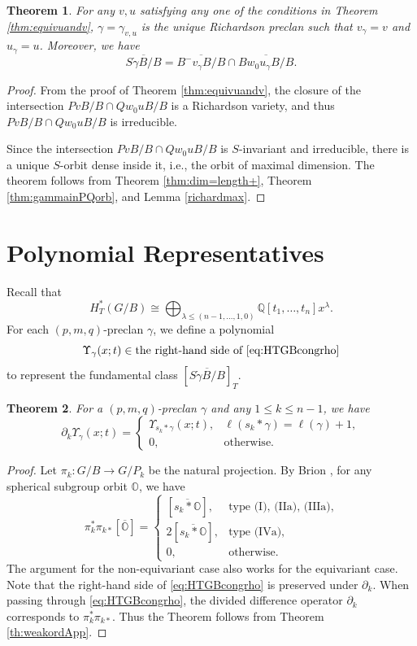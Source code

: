 \documentclass[12pt,reqno]{amsart}
\numberwithin{equation}{section}
\newtheorem{theorem}{Theorem}[section]
\theoremstyle{definition}
\begin{document}
\begin{theorem}\label{prop:RichApp}
For any $v,u$ satisfying any one of the conditions in Theorem \ref{thm:equivuandv}, $\gamma=\gamma_{v,u}$ is the unique  Richardson preclan  such that $v_{\gamma}=v$ and $u_{\gamma} =u$. 
Moreover, we have 
$$\overline{S\dot{\gamma}B/B}=\overline{B^-v_\gamma B/B}\cap \overline{Bw_0u_\gamma B/B}. $$
\end{theorem}
\begin{proof}
From the proof of Theorem \ref{thm:equivuandv}, 
the closure of the intersection $PvB/B\cap Qw_0uB/B$ is a Richardson variety, and thus $PvB/B\cap Qw_0uB/B$ is irreducible. 

Since the intersection $PvB/B\cap Qw_0uB/B$ is $S$-invariant and irreducible, there is a unique $S$-orbit dense inside it, i.e., the orbit of maximal dimension. 
The theorem  follows from Theorem \ref{thm:dim=length+},  Theorem \ref{thm:gammainPQorb}, and Lemma \ref{richardmax}.
\end{proof}



\section{Polynomial Representatives}\label{Polynomial Representatives}

Recall that 
\begin{equation}\label{eq:HTGBcongrho}
H_T^*(G/B)\cong  \bigoplus_{\lambda\leq (n-1,\ldots,1,0)} \mathbb{Q}[t_1,\ldots,t_n]x^{\lambda}.
\end{equation}
For each $(p,m,q)$-preclan $\gamma$, we define a polynomial
$$\Upsilon_{\gamma}(x;t) \in  \text{the right-hand side of \eqref{eq:HTGBcongrho}}$$
to represent the fundamental class $[\overline{S\dot{\gamma}B/B}]_T$. 


\begin{theorem}\label{thm:dkonUpsilon}
For a $(p,m,q)$-preclan $\gamma$ and any $1\leq k\leq n-1$, we have
$$\partial_k 
\Upsilon_\gamma(x;t)
=\begin{cases}
\Upsilon_{s_k*\gamma}(x;t), & \ell(s_k*\gamma)=\ell(\gamma)+1,\\
0,& \text{otherwise}. 
\end{cases}$$
\end{theorem}
\begin{proof}
Let $\pi_k:G/B\to G/P_k$ be the natural projection. By Brion \cite{Brion}, for any spherical subgroup orbit $\mathbb{O}$, we have 
$$\pi_{k}^*\pi_{k*} [\overline{\mathbb{O}}]
= \begin{cases}
[\overline{s_k*\mathbb{O}}], 
& \text{type (I), (IIa), (IIIa)},\\
2[\overline{s_k*\mathbb{O}}], 
& \text{type (IVa)},\\
0, & \text{otherwise}. 
\end{cases}$$
The argument for the non-equivariant case also works for the equivariant case. 
Note that the right-hand side of \eqref{eq:HTGBcongrho} is preserved under $\partial_k$. 
When passing through \eqref{eq:HTGBcongrho}, the divided difference operator $\partial_k$ corresponds to $\pi_k^*\pi_{k*}$.  
Thus the Theorem follows from Theorem \ref{th:weakordApp}. 
\end{proof}
\end{document}
